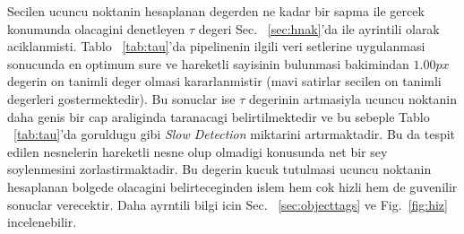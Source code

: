 \documentclass[review]{elsarticle}
\begin{document}
Secilen ucuncu noktanin hesaplanan degerden ne kadar bir sapma ile gercek konumunda olacagini denetleyen $\tau$ degeri Sec. ~\ref{sec:hnak}'da ile ayrintili olarak aciklanmisti. Tablo ~\ref{tab:tau}'da pipelinenin ilgili veri setlerine uygulanmasi sonucunda en optimum sure ve hareketli sayisinin bulunmasi bakimindan $1.00 px$ degerin on tanimli deger olmasi kararlanmistir (mavi satirlar secilen on tanimli degerleri gostermektedir). Bu sonuclar ise $\tau$ degerinin artmasiyla ucuncu noktanin daha genis bir cap araliginda taranacagi belirtilmektedir ve bu sebeple Tablo ~\ref{tab:tau}'da goruldugu gibi \textit{Slow Detection} miktarini artırmaktadir. Bu da tespit edilen nesnelerin hareketli nesne olup olmadigi konusunda net bir sey soylenmesini zorlastirmaktadir. Bu degerin kucuk tutulmasi ucuncu noktanin hesaplanan bolgede olacagini belirteceginden islem hem cok hizli hem de guvenilir sonuclar verecektir. Daha ayrntili bilgi icin Sec. ~\ref{sec:objecttags} ve Fig.~\ref{fig:hiz} incelenebilir.
\end{document}
